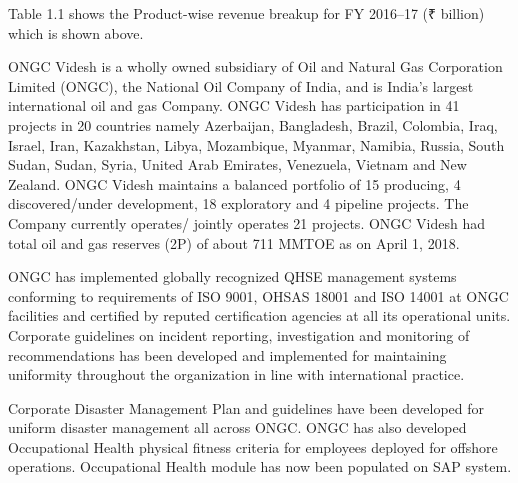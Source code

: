 \noindent Table 1.1 shows the Product-wise revenue breakup for FY 2016–17 (₹ billion) which is shown above.

\vspace{2em}


\noindent ONGC Videsh is a wholly owned subsidiary of Oil and Natural Gas Corporation Limited (ONGC), 
the National Oil Company of India, and is India’s largest international oil and gas Company. 
ONGC Videsh has participation in 41 projects in 20 countries namely Azerbaijan, Bangladesh, Brazil, 
Colombia, Iraq, Israel, Iran, Kazakhstan, Libya, Mozambique, Myanmar, Namibia, Russia, South Sudan, Sudan,
Syria, United Arab Emirates, Venezuela, Vietnam and New Zealand. ONGC Videsh maintains 
a balanced portfolio of 15 producing, 4 discovered/under development, 18 exploratory and 4 pipeline projects. 
The Company currently operates/ jointly operates 21 projects. ONGC Videsh had total oil and gas reserves (2P) 
of about 711 MMTOE as on April 1, 2018.

\vspace{2em}

\noindent ONGC has implemented globally recognized QHSE management systems conforming to requirements of ISO 9001, 
OHSAS 18001 and ISO 14001 at ONGC facilities and certified by reputed certification agencies at all its 
operational units. Corporate guidelines on incident reporting, investigation and monitoring of recommendations
has been developed and implemented for maintaining uniformity throughout the organization in line with 
international practice.

\vspace{2em}

\noindent Corporate Disaster Management Plan and guidelines have been developed for uniform disaster management 
all across ONGC. ONGC has also developed Occupational Health physical fitness criteria for employees 
deployed for offshore operations. Occupational Health module has now been populated on SAP system.
